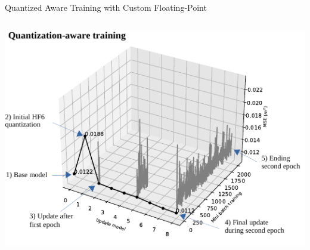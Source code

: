 \begin{frame}{Quantized Aware Training with Custom Floating-Point}
\begin{columns}
		\centering
		\includegraphics[width=0.65\linewidth]{slides/figures/QAT.pdf} %
	\end{columns}
\end{frame}

